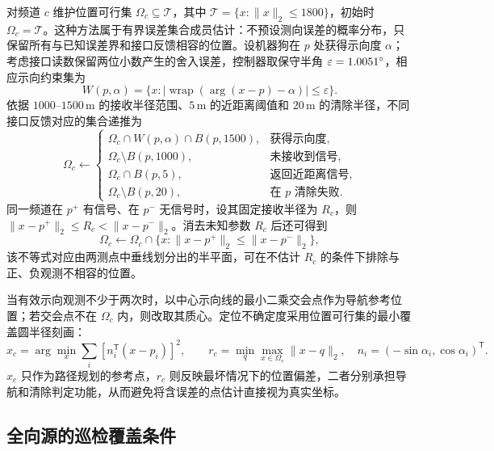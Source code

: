 对频道 $c$ 维护位置可行集 $\Omega_c\subseteq\mathcal T$，其中 $\mathcal T=\{x:\|x\|_2\le1800\}$，初始时 $\Omega_c=\mathcal T$。这种方法属于有界误差集合成员估计\cite{milanese1996bounding}：不预设测向误差的概率分布，只保留所有与已知误差界和接口反馈相容的位置。设机器狗在 $p$ 处获得示向度 $\alpha$；考虑接口读数保留两位小数产生的舍入误差，控制器取保守半角 $\varepsilon=1.0051^{\circ}$，相应示向约束集为
\begin{equation}
  W(p,\alpha)=\{x:|\operatorname{wrap}(\arg(x-p)-\alpha)|\le\varepsilon\}.
\end{equation}
依据 $1000$--$1500\,\mathrm m$ 的接收半径范围、$5\,\mathrm m$ 的近距离阈值和 $20\,\mathrm m$ 的清除半径，不同接口反馈对应的集合递推为
\begin{equation}
\Omega_c\leftarrow
\begin{cases}
\Omega_c\cap W(p,\alpha)\cap B(p,1500), & \text{获得示向度},\\
\Omega_c\setminus B(p,1000),            & \text{未接收到信号},\\
\Omega_c\cap B(p,5),                    & \text{返回近距离信号},\\
\Omega_c\setminus B(p,20),              & \text{在 $p$ 清除失败}.
\end{cases}
\label{eq:p3-update}
\end{equation}
同一频道在 $p^+$ 有信号、在 $p^-$ 无信号时，设其固定接收半径为 $R_c$，则
$\|x-p^+\|_2\le R_c<\|x-p^-\|_2$。消去未知参数 $R_c$ 后还可得到
\begin{equation}
  \Omega_c\leftarrow\Omega_c\cap
  \{x:\|x-p^+\|_2\le\|x-p^-\|_2\},
  \label{eq:p3-halfplane}
\end{equation}
该不等式对应由两测点中垂线划分出的半平面，可在不估计 $R_c$ 的条件下排除与正、负观测不相容的位置。

当有效示向观测不少于两次时，以中心示向线的最小二乘交会点作为导航参考位置；若交会点不在 $\Omega_c$ 内，则改取其质心。定位不确定度采用位置可行集的最小覆盖圆半径刻画\cite{welzl1991smallest}：
\begin{equation}
  \hat x_c=\arg\min_x\sum_i[n_i^{\mathsf T}(x-p_i)]^2,
  \qquad
  r_c=\min_q\max_{x\in\Omega_c}\|x-q\|_2,
  \quad n_i=(-\sin\alpha_i,\cos\alpha_i)^{\mathsf T}.
  \label{eq:p3-estimation}
\end{equation}
$\hat x_c$ 只作为路径规划的参考点，$r_c$ 则反映最坏情况下的位置偏差，二者分别承担导航和清除判定功能，从而避免将含误差的点估计直接视为真实坐标。

\subsection{全向源的巡检覆盖条件}

